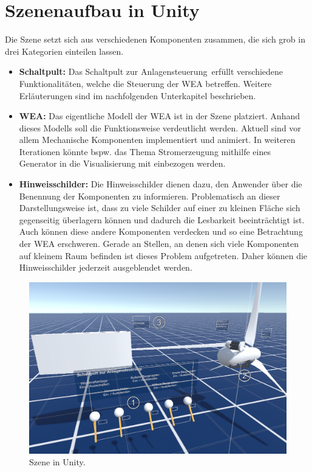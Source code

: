 \section{Szenenaufbau in Unity}
\label{sec:Szenenaufbau}

Die Szene setzt sich aus verschiedenen Komponenten zusammen, die sich grob in drei Kategorien einteilen lassen.

\begin{itemize}
\item \textbf{Schaltpult:} Das \glqq Schaltpult zur Anlagensteuerung\grqq\,   erfüllt verschiedene Funktionalitäten, welche die Steuerung der WEA betreffen. Weitere Erläuterungen sind im nachfolgenden Unterkapitel  beschrieben. 

\item \textbf{WEA:}  
Das eigentliche Modell der WEA   ist in der Szene platziert. Anhand dieses Modells soll die Funktionsweise verdeutlicht werden. Aktuell sind vor allem Mechanische Komponenten implementiert und animiert. In weiteren Iterationen könnte bspw. das Thema Stromerzeugung mithilfe eines Generator in die Visualisierung mit einbezogen werden. 

\item \textbf{Hinweisschilder:} Die Hinweisschilder  dienen dazu, den Anwender über die Benennung der Komponenten zu informieren. Problematisch an dieser Darstellungsweise ist, dass zu viele Schilder auf einer zu kleinen Fläche sich gegenseitig überlagern können und dadurch die Lesbarkeit beeinträchtigt ist. Auch können diese andere Komponenten verdecken und so eine Betrachtung der WEA erschweren. Gerade an Stellen, an denen sich viele Komponenten auf kleinem Raum befinden ist dieses Problem aufgetreten. Daher können die Hinweisschilder jederzeit ausgeblendet werden.

\end{itemize}
  
\begin{figure}[H]
	\centering
	\captionsetup{width=1\textwidth}
	\includegraphics[keepaspectratio, width=1\textwidth]{bildquellen/szene}
	\caption{Szene in Unity.}
	\label{fig:4.1}
\end{figure}

